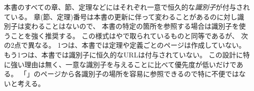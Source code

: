 \documentclass[index]{subfiles}
\begin{document}

本書のすべての章、節、定理などにはそれぞれ一意で恒久的な\emph{識別子}が付与されている。
章(節、定理)番号は本書の更新に伴って変わることがあるのに対し識別子は変わることはないので、
本書の特定の箇所を参照する場合は識別子を使うことを強く推奨する。
この様式はやで取られているものと同等であるが、
次の2点で異なる。
1つは、本書では定理や定義ごとのページは作成していない。
もう1つは、本書では識別子に恒久的なURLは付与されていない。
この設計に特に強い理由は無く、一意な識別子を与えることに比べて優先度が低いだけである。
「\hyperlink{ListOfNodes}{\myNodeIndexTitle}」のページから各識別子の場所を容易に参照できるので特に不便ではないと考える。
\end{document}
